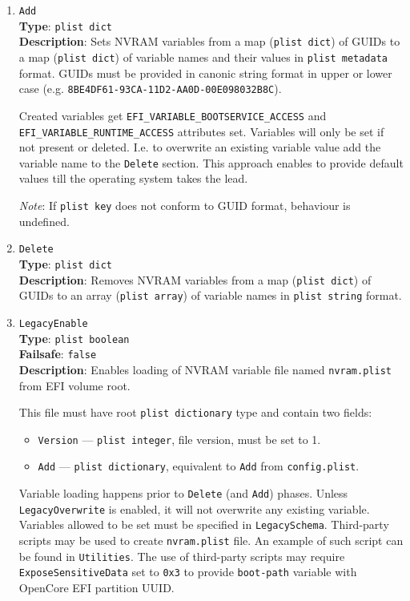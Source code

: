 \documentclass[]{article}
\providecommand{\tightlist}{%
  \setlength{\itemsep}{0pt}\setlength{\parskip}{0pt}}
\begin{document}
\begin{enumerate}
\item
  \texttt{Add}\\
  \textbf{Type}: \texttt{plist\ dict}\\
  \textbf{Description}: Sets NVRAM variables from a map (\texttt{plist\ dict})
  of GUIDs to a map (\texttt{plist\ dict}) of variable names and their values
  in \texttt{plist\ metadata} format. GUIDs must be provided in canonic string
  format in upper or lower case (e.g. \texttt{8BE4DF61-93CA-11D2-AA0D-00E098032B8C}).

  Created variables get \texttt{EFI\_VARIABLE\_BOOTSERVICE\_ACCESS} and
  \texttt{EFI\_VARIABLE\_RUNTIME\_ACCESS} attributes set.
  Variables will only be set if not present or deleted. I.e. to overwrite
  an existing variable value add the variable name to the \texttt{Delete} section.
  This approach enables to provide default values till the operating system
  takes the lead.

  \emph{Note}: If \texttt{plist\ key} does not conform to GUID format,
  behaviour is undefined.

\item
  \texttt{Delete}\\
  \textbf{Type}: \texttt{plist\ dict}\\
  \textbf{Description}: Removes NVRAM variables from a map (\texttt{plist\ dict})
  of GUIDs to an array (\texttt{plist\ array}) of variable names in
  \texttt{plist\ string} format.

\item
  \texttt{LegacyEnable}\\
  \textbf{Type}: \texttt{plist\ boolean}\\
  \textbf{Failsafe}: \texttt{false}\\
  \textbf{Description}: Enables loading of NVRAM variable file named \texttt{nvram.plist}
  from EFI volume root.

  This file must have root \texttt{plist\ dictionary} type and contain two fields:
  \begin{itemize}
  \tightlist
  \item \texttt{Version} --- \texttt{plist\ integer}, file version, must be set to 1.
  \item \texttt{Add} --- \texttt{plist\ dictionary}, equivalent to \texttt{Add} from
  \texttt{config.plist}.
  \end{itemize}

  Variable loading happens prior to \texttt{Delete} (and \texttt{Add}) phases. Unless
  \texttt{LegacyOverwrite} is enabled, it will not overwrite any existing variable.
  Variables allowed to be set must be specified in \texttt{LegacySchema}.
  Third-party scripts may be used to create \texttt{nvram.plist}
  file. An example of such script can be found in \texttt{Utilities}. The use of third-party
  scripts may require \texttt{ExposeSensitiveData} set to \texttt{0x3} to provide
  \texttt{boot-path} variable with OpenCore EFI partition UUID.


\end{enumerate}
\end{document}

